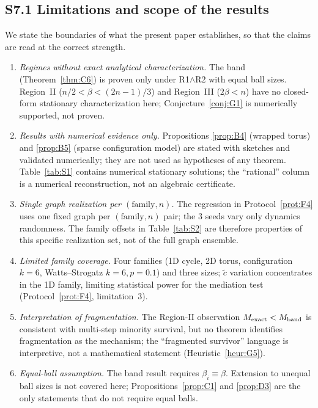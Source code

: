 \documentclass[preprint,12pt]{elsarticle}
\newcommand{\ctil}{\tilde{c}}
\begin{document}
\subsection*{S7.1 Limitations and scope of the results}
\label{sec:limitations}

We state the boundaries of what the present paper establishes, so that
the claims are read at the correct strength.

\begin{enumerate}
\item \emph{Regimes without exact analytical characterization.} The
band (Theorem~\ref{thm:C6}) is proven only under R1$\wedge$R2 with
equal ball sizes. Region~II ($n/2<\beta<(2n-1)/3$) and Region~III
($2\beta<n$) have no closed-form stationary characterization here;
Conjecture~\ref{conj:G1} is numerically supported, not proven.
\item \emph{Results with numerical evidence only.} Propositions
\ref{prop:B4} (wrapped torus) and \ref{prop:B5} (sparse configuration
model) are stated with sketches and validated numerically; they are not
used as hypotheses of any theorem. Table~\ref{tab:S1} contains
numerical stationary solutions; the ``rational'' column is a numerical
reconstruction, not an algebraic certificate.
\item \emph{Single graph realization per $(\text{family},n)$.} The
regression in Protocol~\ref{prot:F4} uses one fixed graph per
$(\text{family},n)$ pair; the 3 seeds vary only dynamics randomness.
The family offsets in Table~\ref{tab:S2} are therefore properties of
this specific realization set, not of the full graph ensemble.
\item \emph{Limited family coverage.} Four families (1D cycle, 2D
torus, configuration $k=6$, Watts--Strogatz $k=6,p=0.1$) and three
sizes; $\ctil$ variation concentrates in the 1D family, limiting
statistical power for the mediation test
(Protocol~\ref{prot:F4}, limitation~3).
\item \emph{Interpretation of fragmentation.} The Region-II
observation $M_{\rm exact}<M_{\rm band}$ is consistent with multi-step
minority survival, but no theorem identifies fragmentation as the
mechanism; the ``fragmented survivor'' language is interpretive, not a
mathematical statement (Heuristic~\ref{heur:G5}).
\item \emph{Equal-ball assumption.} The band result requires
$\beta_i\equiv\beta$. Extension to unequal ball sizes is not covered
here; Propositions~\ref{prop:C1} and \ref{prop:D3} are the only
statements that do not require equal balls.

\end{enumerate}
\end{document}

